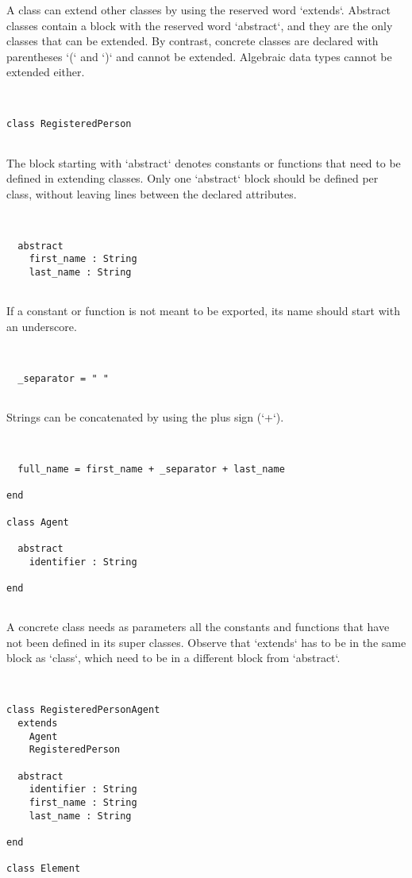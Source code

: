 \documentclass[12pt,a4paper]{article}
\begin{document}
A class can extend other classes by using the reserved word `extends`.
 Abstract classes contain a block with the reserved word `abstract`, and they are the only
 classes that can be extended.
 By contrast, concrete classes are declared with parentheses `(` and `)` and cannot be
 extended. Algebraic data types cannot be extended either.


\begin{lstlisting}


class RegisteredPerson


\end{lstlisting}

  The block starting with `abstract` denotes constants or functions that need to be defined
   in extending classes. Only one `abstract` block should be defined per class, without
   leaving lines between the declared attributes.


\begin{lstlisting}


  abstract
    first_name : String
    last_name : String


\end{lstlisting}

  If a constant or function is not meant to be exported, its name should start with an
   underscore.


\begin{lstlisting}


  _separator = " "


\end{lstlisting}

  Strings can be concatenated by using the plus sign (`+`).


\begin{lstlisting}


  full_name = first_name + _separator + last_name

end

class Agent

  abstract
    identifier : String

end


\end{lstlisting}

A concrete class needs as parameters all the constants and functions that have not been
 defined in its super classes. Observe that `extends` has to be in the same block as
 `class`, which need to be in a different block from `abstract`.


\begin{lstlisting}


class RegisteredPersonAgent
  extends
    Agent
    RegisteredPerson

  abstract
    identifier : String
    first_name : String
    last_name : String

end

class Element


\end{lstlisting}
\end{document}
